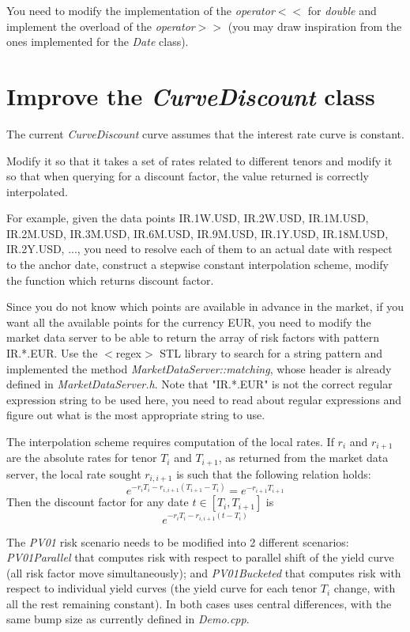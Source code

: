\documentclass[10pt]{article}
\begin{document}
You need to modify the implementation of the \textit{operator$<<$} for \textit{double} and implement the overload of the \textit{operator$>>$} (you may draw inspiration from the ones implemented for the \textit{Date} class).

\section{Improve the \textit{CurveDiscount} class}
The current \textit{CurveDiscount} curve assumes that the interest rate curve is constant.

Modify it so that it takes a set of rates related to different tenors and modify it so that when querying for a discount factor, the value returned is correctly interpolated.

For example, given the data points {IR.1W.USD, IR.2W.USD, IR.1M.USD, IR.2M.USD, IR.3M.USD, IR.6M.USD, IR.9M.USD, IR.1Y.USD, IR.18M.USD, IR.2Y.USD, ...}, you need to resolve each of them to an actual date with respect to the anchor date, construct a stepwise constant interpolation scheme, modify the function which returns discount factor.

Since you do not know which points are available in advance in the market, if you want all the available points for the currency EUR, you need to modify the market data server to be able to return the array of risk factors with pattern IR.*.EUR. Use the $<$regex$>$ STL library to search for a string pattern and implemented the method \textit{MarketDataServer::matching}, whose header is already defined in \textit{MarketDataServer.h}. Note that "IR.*.EUR" is not the correct regular expression string to be used here, you need to read about regular expressions and figure out what is the most appropriate string to use.

The interpolation scheme requires computation of the local rates. If $r_i$ and $r_{i+1}$ are the absolute rates for tenor $T_i$ and $T_{i+1}$, as returned from the market data server, the local rate sought $r_{i,i+1}$ is such that the following relation holds:
 $$e^{-r_iT_i-r_{i,i+1}(T_{i+1}-T_i)}=e^{-r_{i+1}T_{i+1}}$$
Then the discount factor for any date $t \in [T_i,T_{i+1}]$ is $$e^{-r_i T_i-r_{i,i+1}(t-T_i)}$$

The \textit{PV01} risk scenario needs to be modified into 2 different scenarios: \textit{PV01Parallel} that computes risk with respect to parallel shift of the yield curve (all risk factor move simultaneously); and \textit{PV01Bucketed} that computes risk with respect to individual yield curves (the yield curve for each tenor $T_i$ change, with all the rest remaining constant). In both cases uses central differences, with the same bump size as currently defined in \textit{Demo.cpp}.\\
\end{document}
